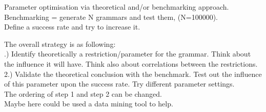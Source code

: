 \noindent Parameter optimisation via theoretical and/or benchmarking approach. \\ Benchmarking = generate N grammars and test them, (N=100000). \\
Define a success rate and try to increase it. \\

\pagebreak

\noindent The overall strategy is as following: \\

.) Identify theoretically a restriction/parameter for the grammar. Think about the influence it will have. Think also about correlations between the restrictions.\\
2.) Validate the theoretical conclusion with the benchmark. Test out the influence of this parameter upon the success rate. Try different parameter settings. \\

\noindent The ordering of step 1 and step 2 can be changed.\\

\noindent Maybe here could be used a data mining tool to help. \\

\pagebreak
